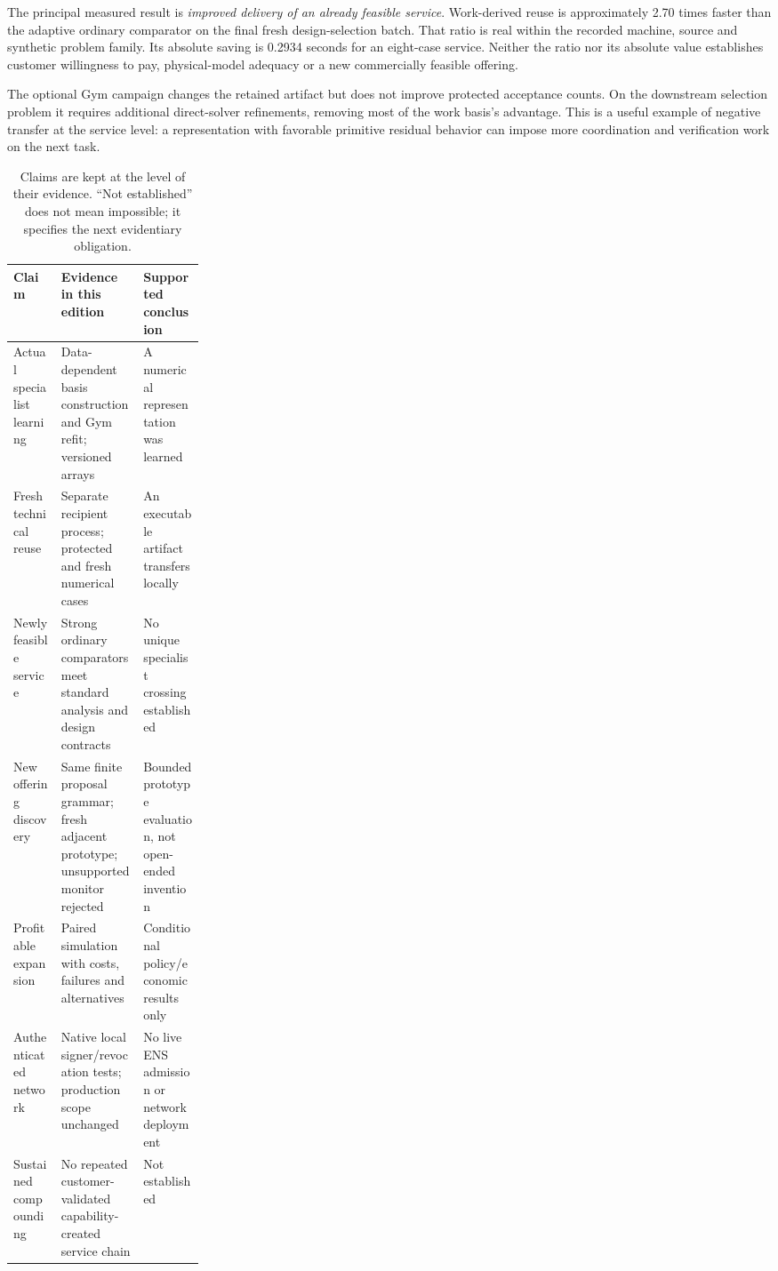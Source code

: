 \documentclass[11pt,letterpaper]{article}
\begin{document}
The principal measured result is \emph{improved delivery of an already feasible service}. Work-derived reuse is approximately 2.70 times faster than the adaptive ordinary comparator on the final fresh design-selection batch. That ratio is real within the recorded machine, source and synthetic problem family. Its absolute saving is 0.2934 seconds for an eight-case service. Neither the ratio nor its absolute value establishes customer willingness to pay, physical-model adequacy or a new commercially feasible offering.

The optional Gym campaign changes the retained artifact but does not improve protected acceptance counts. On the downstream selection problem it requires additional direct-solver refinements, removing most of the work basis's advantage. This is a useful example of negative transfer at the service level: a representation with favorable primitive residual behavior can impose more coordination and verification work on the next task.

\begin{table}[htbp]\centering\small
\begin{tabularx}{\linewidth}{p{0.25\linewidth}YY}\toprule
Claim & Evidence in this edition & Supported conclusion\\\midrule
Actual specialist learning & Data-dependent basis construction and Gym refit; versioned arrays & A numerical representation was learned\\
Fresh technical reuse & Separate recipient process; protected and fresh numerical cases & An executable artifact transfers locally\\
Newly feasible service & Strong ordinary comparators meet standard analysis and design contracts & No unique specialist crossing established\\
New offering discovery & Same finite proposal grammar; fresh adjacent prototype; unsupported monitor rejected & Bounded prototype evaluation, not open-ended invention\\
Profitable expansion & Paired simulation with costs, failures and alternatives & Conditional policy/economic results only\\
Authenticated network & Native local signer/revocation tests; production scope unchanged & No live ENS admission or network deployment\\
Sustained compounding & No repeated customer-validated capability-created service chain & Not established\\\bottomrule
\end{tabularx}
\caption{Claims are kept at the level of their evidence. ``Not established'' does not mean impossible; it specifies the next evidentiary obligation.}
\end{table}
\end{document}
